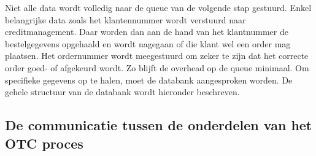 Niet alle data wordt volledig naar de queue van de volgende stap gestuurd. Enkel belangrijke data zoals het klantennummer wordt verstuurd naar creditmanagement. Daar worden dan aan de hand van het klantnummer de bestelgegevens opgehaald en wordt nagegaan of die klant wel een order mag plaatsen. Het ordernummer wordt meegestuurd om zeker te zijn dat het correcte order goed- of afgekeurd wordt. Zo blijft de overhead op de queue minimaal. Om specifieke gegevens op te halen, moet de databank aangesproken worden. De gehele structuur van de databank wordt hieronder beschreven.

\subsection{De communicatie tussen de onderdelen van het OTC proces}

